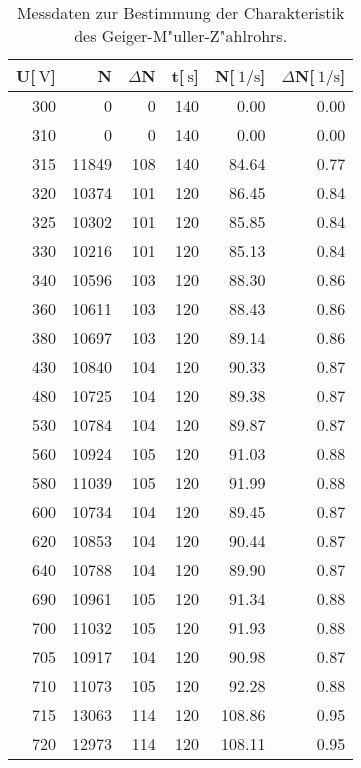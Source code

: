 
\begin{table}[!h]
\begin{center}
\begin{tabular}{|r|r|r|r|r|r|}
\hline
U[$\SI{}{\volt}$] &	N & $\Delta$N & t[$\SI{}{\second}$] & N[$\SI{}{1\per\second}$] & $\Delta$N[$\SI{}{1\per\second}$]\\
\hline
\hline
300	 &   0	    & 0	&  140 & 0.00 & 0.00\\
310	 &   0	    & 0	&  140 & 0.00 & 0.00\\
315	 &   11849	& 108	&  140 & 84.64	& 0.77\\
320	 &   10374	& 101	&  120 & 86.45	& 0.84\\
325	 &   10302	& 101	&  120 & 85.85	& 0.84\\
330	 &   10216	& 101	&  120 & 85.13	& 0.84\\
340	 &   10596	& 103	&  120 & 88.30	& 0.86\\
360	 &   10611	& 103	&  120 & 88.43	& 0.86\\
380	 &   10697	& 103	&  120 & 89.14	& 0.86\\
430	 &   10840	& 104	&  120 & 90.33	& 0.87\\
480	 &   10725	& 104	&  120 & 89.38	& 0.87\\
530	 &   10784	& 104	&  120 & 89.87	& 0.87\\
560	 &   10924	& 105	&  120 & 91.03	& 0.88\\
580	 &   11039	& 105	&  120 & 91.99	& 0.88\\
600	 &   10734	& 104	&  120 & 89.45	& 0.87\\
620	 &   10853	& 104	&  120 & 90.44	& 0.87\\
640	 &   10788	& 104	&  120 & 89.90	& 0.87\\
690	 &   10961	& 105	&  120 & 91.34	& 0.88\\
700	 &   11032	& 105	&  120 & 91.93	& 0.88\\
705	 &   10917	& 104	&  120 & 90.98	& 0.87\\
710	 &   11073	& 105	&  120 & 92.28	& 0.88\\
715	 &   13063	& 114	&  120 & 108.86 &0.95\\
720	 &   12973	& 114	&  120 & 108.11 &0.95\\
\hline
\end{tabular}
\caption[Aufgabe a]{Messdaten zur Bestimmung der Charakteristik des Geiger-M"uller-Z"ahlrohrs.}
\label{tabellea}
\end{center}
\end{table}
